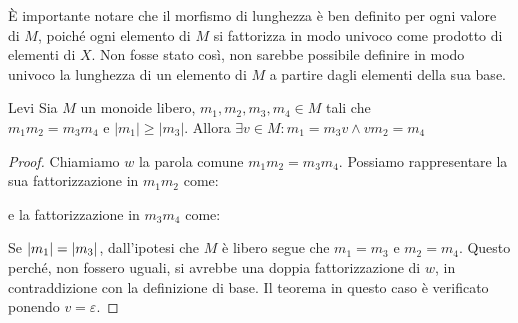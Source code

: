 \begin{observation}{}
  È importante notare che il morfismo di lunghezza è ben definito per ogni valore di \(M\), poiché ogni elemento di \(M\) si fattorizza in modo univoco come prodotto di elementi di \(X\).
  Non fosse stato così, non sarebbe possibile definire in modo univoco la lunghezza di un elemento di \(M\) a partire dagli elementi della sua base.
\end{observation}

\begin{lemma}[namedlabel={lem:levi}{Levi}]{Levi}
  Sia \(M\) un monoide libero, \(m_1,m_2,m_3,m_4 \in M\) tali che \(m_1m_2=m_3m_4 \text{ e } |m_1| \geq |m_3|\).
  Allora \(\exists v \in M: m_1 = m_3v \land vm_2 = m_4\)
\end{lemma}

\begin{proof}
  Chiamiamo \(w\) la parola comune \(m_1m_2 = m_3m_4\).
  Possiamo rappresentare la sua fattorizzazione in \(m_1m_2\) come:
  \begin{figure}[H]
    \centering
  \end{figure}
  e la fattorizzazione in \(m_3m_4\) come:
  \begin{figure}[H]
    \centering
  \end{figure}
  Se \(\left|m_1\right| = \left|m_3\right|\), dall'ipotesi che \(M\) è libero segue che \(m_1 = m_3\) e \(m_2 = m_4\).
  Questo perché, non fossero uguali, si avrebbe una doppia fattorizzazione di \(w\), in contraddizione con la definizione di base.
  Il teorema in questo caso è verificato ponendo \(v = \varepsilon\).


\end{proof}
